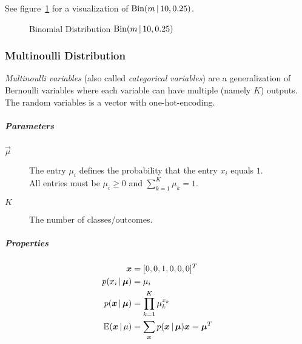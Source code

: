 	See figure~\ref{fig:binomialDistribution} for a visualization of \( \textrm{Bin}(m \,\vert\, 10, 0.25) \).

	\begin{figure}
		\centering
		\caption{Binomial Distribution \( \textrm{Bin}(m \,\vert\, 10, 0.25) \)}
		\label{fig:binomialDistribution}
	\end{figure}

\subsubsection{Multinoulli Distribution}
\emph{Multinoulli variables} (also called \emph{categorical variables}) are a generalization of Bernoulli variables where each variable can have multiple (namely \(K\)) outputs. The random variables is a vector with one-hot-encoding.

\subparagraph{Parameters}
\begin{description}
	\item[\(\vec{\mu}\)] The entry \(\mu_i\) defines the probability that the entry \(x_i\) equals \(1\). \\ All entries must be \( \mu_i \geq 0 \) and \( \sum_{k = 1}^{K} \mu_k = 1 \).
	\item [\(K\)] The number of classes/outcomes.
\end{description}

\subparagraph{Properties}
	\begin{align}
		\bm{x}                     & = [ 0, 0, 1, 0, 0, 0 ]^T                                           \\
		p(x_i \,\vert\, \bm{\mu})     & = \mu_i                                                            \\
		p(\bm{x} \,\vert\, \bm{\mu}) & = \prod_{k = 1}^{K} \mu_k^{x_k}                                    \\
		\mathbb{E}(\bm{x} \,\vert\, \mu)      & = \sum_{\bm{x}} p(\bm{x} \,\vert\, \bm{\mu}) \bm{x} = \bm{\mu}^T
	\end{align}


